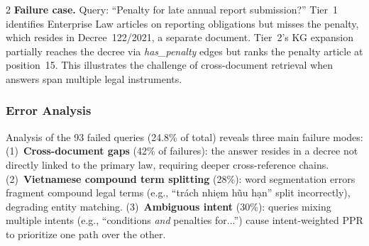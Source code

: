 \documentclass[11pt,a4paper]{article}
\begin{document}
\begin{multicols}{2}
\textbf{Failure case.} Query: ``Penalty for late annual report submission?'' Tier~1 identifies Enterprise Law articles on reporting obligations but misses the penalty, which resides in Decree~122/2021, a separate document. Tier~2's KG expansion partially reaches the decree via \textit{has\_penalty} edges but ranks the penalty article at position~15. This illustrates the challenge of cross-document retrieval when answers span multiple legal instruments.

\subsubsection{Error Analysis}

Analysis of the 93 failed queries (24.8\% of total) reveals three main failure modes: (1)~\textbf{Cross-document gaps} (42\% of failures): the answer resides in a decree not directly linked to the primary law, requiring deeper cross-reference chains. (2)~\textbf{Vietnamese compound term splitting} (28\%): word segmentation errors fragment compound legal terms (e.g., ``tr\'ach nhi\d{e}m h\~{u}u h\d{a}n'' split incorrectly), degrading entity matching. (3)~\textbf{Ambiguous intent} (30\%): queries mixing multiple intents (e.g., ``conditions \textit{and} penalties for...'') cause intent-weighted PPR to prioritize one path over the other.

\end{multicols}
\end{document}
